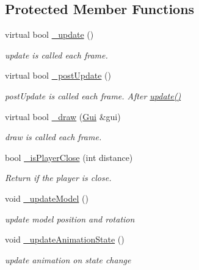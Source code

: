 \subsection*{Protected Member Functions}
\begin{DoxyCompactItemize}
\item 
virtual bool \hyperlink{class_enemy_crispy_ad48755d398b40e0000806a89025802a1}{\+\_\+update} ()
\begin{DoxyCompactList}\small\item\em update is called each frame. \end{DoxyCompactList}\item 
virtual bool \hyperlink{class_enemy_crispy_a7493983cc06e648d1ac8fd80dd8c64f3}{\+\_\+post\+Update} ()
\begin{DoxyCompactList}\small\item\em post\+Update is called each frame. After \hyperlink{class_a_enemy_a01e3b0313d6f29bf2cafe20f711c0550}{update()} \end{DoxyCompactList}\item 
virtual bool \hyperlink{class_enemy_crispy_a82cd9389ee451c2ca4e71ff86989e870}{\+\_\+draw} (\hyperlink{class_gui}{Gui} \&gui)
\begin{DoxyCompactList}\small\item\em draw is called each frame. \end{DoxyCompactList}\item 
bool \hyperlink{class_enemy_crispy_a5e3bef4e40dfeb57ec87ea23b7a57e18}{\+\_\+is\+Player\+Close} (int distance)
\begin{DoxyCompactList}\small\item\em Return if the player is close. \end{DoxyCompactList}\item 
\mbox{\label{class_enemy_crispy_a9531e9669fd3dcbb524f7db88ef68787}} 
void \hyperlink{class_enemy_crispy_a9531e9669fd3dcbb524f7db88ef68787}{\+\_\+update\+Model} ()
\begin{DoxyCompactList}\small\item\em update model position and rotation \end{DoxyCompactList}\item 
\mbox{\label{class_enemy_crispy_adeb54234eea6e5f6b0e9e3704bf3352d}} 
void \hyperlink{class_enemy_crispy_adeb54234eea6e5f6b0e9e3704bf3352d}{\+\_\+update\+Animation\+State} ()
\begin{DoxyCompactList}\small\item\em update animation on state change \end{DoxyCompactList}\end{DoxyCompactItemize}
